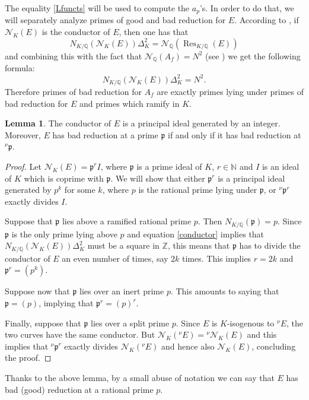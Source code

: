 \documentclass[11pt]{amsart}
\theoremstyle{definition}
\newtheorem{lem}[definizione]{Lemma}
\begin{document}
		The equality \eqref{Lfuncts} will be used to compute the $a_p$'s. In order to do that, we will separately analyze primes of good and bad reduction for $E$.
		According to \cite[Proposition~1]{mil1}, if $\mathcal N_{K}(E)$ is the conductor of $E$, then one has that
		$$N_{K/{\mathbb{Q}}}(\mathcal N_{K}(E))\Delta_K^2=\mathcal N_{\mathbb{Q}}(\operatorname{Res}_{K/{\mathbb{Q}}}(E))$$
		and combining this with the fact that $\mathcal N_{\mathbb{Q}}(A_f)=N^2$ (see \cite{car}) we get the following formula:
		  \begin{equation}\label{conductor}
			  N_{K/{\mathbb{Q}}}(\mathcal N_{K}(E))\Delta_K^2=N^2.
		\end{equation}
	  Therefore primes of bad reduction for $A_f$ are exactly primes lying under primes of bad reduction for $E$ and primes which ramify in $K$.
		  \begin{lem}\label{conductor2}
			    The conductor of $E$ is a principal ideal generated by an integer. Moreover, $E$ has bad reduction at a prime ${\mathfrak{p}}$ if and only if it has bad reduction at ${{}^\nu\!}{\mathfrak{p}}$.
		\end{lem}
	  \begin{proof}
	    Let $\mathcal N_K(E)={\mathfrak{p}}^rI$, where ${\mathfrak{p}}$ is a prime ideal of $K$, $r\in {\mathbb{N}}$ and $I$ is an ideal of $K$ which is coprime with ${\mathfrak{p}}$. We will show that either ${\mathfrak{p}}^r$ is a principal ideal generated by $p^k$ for some $k$, where $p$ is the rational prime lying under ${\mathfrak{p}}$, or ${{}^\nu\!} {\mathfrak{p}}^r$ exactly divides $I$.

	    Suppose that ${\mathfrak{p}}$ lies above a ramified rational prime $p$. Then $N_{K/{\mathbb{Q}}}({\mathfrak{p}})=p$. Since ${\mathfrak{p}}$ is the only prime lying above $p$ and equation \eqref{conductor} implies that $N_{K/{\mathbb{Q}}}(\mathcal N_{K}(E))\Delta_K^2$ must be a square in ${\mathbb{Z}}$, this means that ${\mathfrak{p}}$ has to divide the conductor of $E$ an even number of times, say $2k$ times. This implies $r=2k$ and ${\mathfrak{p}}^r=(p^k)$.

	    Suppose now that ${\mathfrak{p}}$ lies over an inert prime $p$. This amounts to saying that ${\mathfrak{p}}=(p)$, implying that ${\mathfrak{p}}^r=(p)^r$.

	    Finally, suppose that ${\mathfrak{p}}$ lies over a split prime $p$. Since $E$ is $K$-isogenous to ${{}^\nu\!} E$, the two curves have the same conductor. But $\mathcal N_K({{}^\nu\!} E)={{}^\nu\!}\mathcal N_K(E)$ and this implies that ${{}^\nu\!}{\mathfrak{p}}^r$ exactly divides $\mathcal N_K({{}^\nu\!} E)$ and hence also $\mathcal N_K(E)$, concluding the proof.
	\end{proof}
	Thanks to the above lemma, by a small abuse of notation we can say that $E$ has bad (good) reduction at a rational prime $p$.
	
\end{document}

